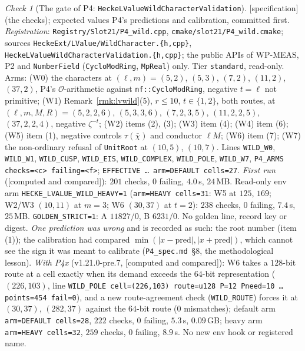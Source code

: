 \documentclass[11pt]{article}
\theoremstyle{remark}
\newtheorem{checkitem}[theorem]{Check}
\newcommand{\CMPD}{\textsf{[computed and compared]}}   %
\newcommand{\SPEC}{\textsf{[specification]}}           %
\begin{document}
\begin{checkitem}[The gate of P4: \texttt{HeckeLValueWildCharacterValidation}]\label{chk:lvwild}
\SPEC{} (the checks); expected values P4's predictions and calibration, committed first. \emph{Registration}: \texttt{Registry/\allowbreak Slot21/\allowbreak P4\_wild.cpp}, \texttt{cmake/\allowbreak slot21/\allowbreak P4\_wild.cmake}; sources
\texttt{HeckeExt/\allowbreak LValue/\allowbreak WildCharacter.\{h,cpp\}}, \texttt{HeckeLValue\allowbreak Wild\allowbreak Character\allowbreak Validation.\{h,cpp\}}; the public APIs of WP-MEAS, P2 and \texttt{NumberField} (\texttt{CycloModRing}, \texttt{MpReal})
only. Tier \texttt{standard}, read-only. Arms: (W0) the characters at $(\ell,m)=(5,2)$, $(5,3)$, $(7,2)$, $(11,2)$, $(37,2)$, P4's $\mathcal O$-arithmetic against \texttt{nf::CycloModRing}, negative $t=\ell$ not primitive;
(W1) Remark~\ref{rmk:lvwild}(5), $r\le10$, $t\in\{1,2\}$, both routes, at $(\ell,m,M,R)=(5,2,2,6)$, $(5,3,3,6)$, $(7,2,3,5)$, $(11,2,2,5)$, $(37,2,2,4)$, negative $\zeta^{-t}$; (W2) items (2), (3);
(W3) item (4); (W4) item (6); (W5) item (1), negative controls $\tau(\bar\chi)$ and conductor $\ell M$; (W6) item (7); (W7) the non-ordinary refusal of \texttt{UnitRoot} at $(10,5)$, $(10,7)$. Lines
\texttt{WILD\_W0}, \texttt{WILD\_W1}, \texttt{WILD\_CUSP}, \texttt{WILD\_EIS}, \texttt{WILD\_COMPLEX}, \texttt{WILD\_POLE}, \texttt{WILD\_W7}, \texttt{P4\_ARMS checks=<c> failing=<f>};
\texttt{EFFECTIVE \dots{} arm=DEFAULT cells=27}. \emph{First run} (\CMPD): $201$ checks, $0$ failing, $4.0$\,s, $24$\,MB. Read-only env arm \texttt{HECKE\_LVALUE\_WILD\_HEAVY=1}
(\texttt{arm=HEAVY cells=31}: W5 at $125$, $169$; W2/W3 $(10,11)$ at $m=3$; W6 $(30,37)$ at $t=2$): $238$ checks, $0$ failing, $7.4$\,s, $25$\,MB. \texttt{GOLDEN\_STRICT=1}: A $11827/0$, B $6231/0$.
No golden line, record key or digest. \emph{One prediction was wrong} and is recorded as such: the root number (item (1)); the calibration had compared $\min(|x-\mathrm{pred}|,|x+\mathrm{pred}|)$,
which cannot see the sign it was meant to calibrate (\texttt{P4\_spec.md}~\S8, the methodological lesson). \emph{With P4x} (v1.21.0-pre.7, \CMPD): W6 takes a $128$-bit route at a cell exactly
when its demand exceeds the $64$-bit representation ($(226,103)$, line \texttt{WILD\_POLE cell=(226,103) route=u128 P=12 Pneed=10 \dots{} points=454 fail=0}), and a new route-agreement check
(\texttt{WILD\_ROUTE}) forces it at $(30,37)$, $(282,37)$ against the $64$-bit route ($0$ mismatches); default arm \texttt{arm=DEFAULT cells=28}, $222$ checks, $0$ failing, $5.3$\,s, $0.09$\,GB; heavy arm
\texttt{arm=HEAVY cells=32}, $259$ checks, $0$ failing, $8.9$\,s. No new env hook or registered name.
\end{checkitem}
\end{document}
